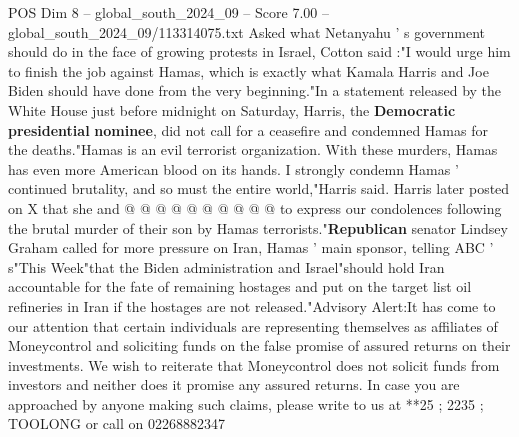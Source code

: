 \begin{textsample}{POS Dim 8 – global\_south\_2024\_09 – Score 7.00 – global\_south\_2024\_09/113314075.txt}
Asked what Netanyahu ' s government should do in the face of growing protests in Israel, Cotton said :"I would urge him to finish the job against Hamas, which is exactly what Kamala Harris and Joe Biden should have done from the very beginning."In a statement released by the White House just before midnight on Saturday, Harris, the \textbf{Democratic} \textbf{presidential} \textbf{nominee}, did not call for a ceasefire and condemned Hamas for the deaths."Hamas is an evil terrorist organization.
With these murders, Hamas has even more American blood on its hands.
I strongly condemn Hamas ' continued brutality, and so must the entire world,"Harris said.
Harris later posted on X that she and @ @ @ @ @ @ @ @ @ @ to express our condolences following the brutal murder of their son by Hamas terrorists."\textbf{Republican} senator Lindsey Graham called for more pressure on Iran, Hamas ' main sponsor, telling ABC ' s"This Week"that the Biden administration and Israel"should hold Iran accountable for the fate of remaining hostages and put on the target list oil refineries in Iran if the hostages are not released."Advisory Alert:It has come to our attention that certain individuals are representing themselves as affiliates of Moneycontrol and soliciting funds on the false promise of assured returns on their investments.
We wish to reiterate that Moneycontrol does not solicit funds from investors and neither does it promise any assured returns.
In case you are approached by anyone making such claims, please write to us at **25 ; 2235 ; TOOLONG or call on 02268882347

\end{textsample}
